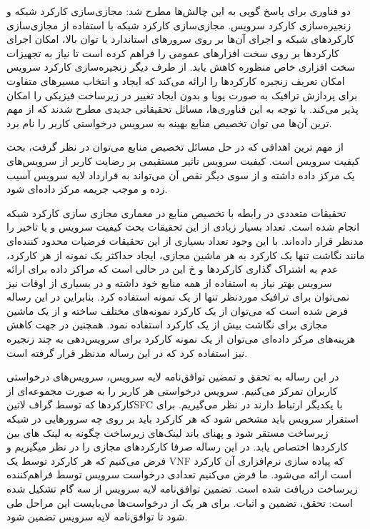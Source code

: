 \documentclass{book}
\begin{document}
دو فناوری برای پاسخ گویی به این چالش‌ها مطرح شد: مجازی‌سازی کارکرد شبکه
و زنجیره‌سازی کارکرد سرویس.
مجازی‌سازی کارکرد شبکه با استفاده از مجازی‌سازی کارکردهای شبکه و اجرای آن‌ها بر روی سرورهای استاندارد با توان بالا، امکان اجرای کارکردها
بر روی سخت افزارهای عمومی را فراهم کرده است تا نیاز به تجهیزات سخت افزاری خاص منظوره کاهش یابد.
از طرف دیگر زنجیره‌سازی کارکرد سرویس امکان تعریف زنجیره کارکردها را ارائه می‌کند که ایجاد و انتخاب مسیرهای متفاوت برای پردازش ترافیک
به صورت پویا و بدون ایجاد تغییر در زیرساخت فیزیکی را امکان پذیر می‌کند.
با توجه به این فناوری‌ها، مسائل تحقیقاتی جدیدی مطرح شدند که از مهم ترین آن‌ها می توان تخصیص منابع بهینه به سرویس درخواستی کاربر را نام برد.

از مهم ترین اهدافی که در حل مسائل تخصیص منابع می‌توان در نظر گرفت، بحث کیفیت سرویس است.
کیفیت سرویس تاثیر مستقیمی بر رضایت کاربر از سرویس‌های یک مرکز داده داشته و از سوی دیگر نقص آن می‌تواند به قرارداد لایه سرویس آسیب زده
و موجب جریمه مرکز داده‌ای شود.

تحقیقات متعددی در رابطه با تخصیص منابع در معماری مجازی سازی کارکرد شبکه انجام شده است.
تعداد بسیار زیادی از این تحقیقات بحث کیفیت سرویس و یا تاخیر را مدنظر قرار داده‌اند. با این وجود تعداد بسیاری از این تحقیقات فرضیات محدود کننده‌ای
مانند نگاشت تنها یک کارکرد به هر ماشین مجازی، ایجاد حداکثر یک نمونه از هر کارکرد، عدم به اشتراک گذاری کارکردها و ‌خ
این در حالی است که مراکز داده برای ارائه سرویس بهتر نیاز به استفاده از همه منابع خود داشته و در بسیاری از اوقات نیز نمی‌توان برای ترافیک موردنظر تنها از یک نمونه استفاده کرد.
بنابراین در این رساله فرض شده است که می‌توان از یک کارکرد نمونه‌های مختلف ساخته و از یک ماشین مجازی برای نگاشت بیش از یک کارکرد استفاده نمود.
همچنین در جهت کاهش هزینه‌های مرکز داده‌ای می‌توان از یک نمونه کارکرد برای سرویس‌دهی به چند زنجیره نیز استفاده کرد که در این رساله مدنظر قرار گرفته است.

در این رساله به تحقق و تمضین توافق‌نامه لایه سرویس، سرویس‌های درخواستی کاربران تمرکز می‌کنیم.
سرویس درخواستی هر کاربر را به صورت مجموعه‌ای از کارکردها که توسط گراف ‌لاتین{SFC} با یکدیگر ارتباط دارند در نظر می‌گیریم.
برای استقرار سرویس باید مشخص شود که هر کارکرد باید بر روی چه سرورهایی در شبکه زیرساخت مستقر شود
و پهنای باند لینک‌های زیرساخت چگونه به لینک های بین کارکردها اختصاص یابد.
در این رساله صرفا کارکردهای مجازی را در نظر میگیریم و فرض می‌کنیم که هر کارکرد توسط یک VNF که پیاده سازی نرم‌افزاری آن کارکرد است ارائه می‌شود.
ما فرض می‌کنیم تعدادی درخواست سرویس توسط فراهم‌کننده زیرساخت دریافت شده است. تضمین توافق‌نامه لایه سرویس از سه گام تشکیل شده است: تحقق، تضمین و اثبات.
برای هر یک از درخواست‌ها می‌بایست این مراحل طی شود تا توافق‌نامه لایه سرویس تضمین شود.
\end{document}
